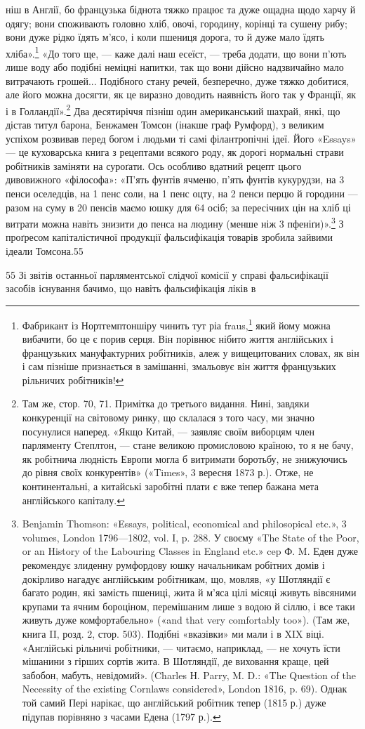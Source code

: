 ніш в Англії, бо французька біднота тяжко працює та дуже
ощадна щодо харчу й одягу; вони споживають головно хліб,
овочі, городину, корінці та сушену рибу; вони дуже рідко їдять
м’ясо, і коли пшениця дорога, то й дуже мало їдять хліба».\footnote{
Фабрикант із Нортгемптоншіру чинить тут ріа fraus,\footnote*{
— благочестивий обман. \emph{Ред.}
} який йому
можна вибачити, бо це є порив серця. Він порівнює нібито життя англійських
і французьких мануфактурних робітників, алеж у вищецитованих
словах, як він і сам пізніше признається в замішанні, змальовує він
життя французьких рільничих робітників!
}
«До того ще, — каже далі наш есеїст, — треба додати, що вони
п’ють лише воду або подібні неміцні напитки, так що вони дійсно
надзвичайно мало витрачають грошей... Подібного стану речей,
безперечно, дуже тяжко добитися, але його можна досягти, як
це виразно доводить наявність його так у Франції, як і в Голландії».\footnote{
Там же, стор. 70, 71. Примітка до третього видання. Нині, завдяки
конкуренції на світовому ринку, що склалася з того часу, ми значно
посунулися наперед. «Якщо Китай, — заявляє своїм виборцям член парляменту
Степлтон, — стане великою промисловою країною, то я не бачу,
як робітнича людність Европи могла б витримати боротьбу, не знижуючись
до рівня своїх конкурентів» («Times», 3 вересня 1873 р.). Отже,
не континентальні, а китайські заробітні плати є вже тепер бажана
мета англійського капіталу.
} Два десятиріччя пізніш один американський шахрай,
янкі, що дістав титул барона, Бенжамен Томсон (інакше граф
Румфорд), з великим успіхом розвивав перед богом і людьми ті
самі філантропічні ідеї. Його «Essays» — це куховарська книга
з рецептами всякого роду, як дорогі нормальні страви робітників
заміняти на суроґати. Ось особливо вдатний рецепт цього
дивовижного «філософа»: «П’ять фунтів ячменю, п’ять фунтів
кукурудзи, на 3 пенси оселедців, на 1 пенс соли, на 1 пенс оцту,
на 2 пенси перцю й городини — разом на суму в 20 пенсів
маємо юшку для 64 осіб; за пересічних цін на хліб ці витрати
можна навіть знизити до  пенса на людину (менше ніж 3 пфеніґи)».\footnote{
Benjamin Thomson: «Essays, political, economical and philosopical
etc.», 3 volumes, London 1796—1802, vol. I, p. 288. У своєму «The
State of the Poor, or an History of the Labouring Classes in England etc.»
cep Ф. M. Еден дуже рекомендує злиденну румфордову юшку начальникам
робітних домів і докірливо нагадує англійським робітникам,
що, мовляв, «у Шотляндії є багато родин, які замість пшениці, жита й
м’яса цілі місяці живуть вівсяними крупами та ячним бороціном, перемішаним
лише з водою й сіллю, і все таки живуть дуже комфортабельно»
(«and that very comfortably too»). (Там же, книга II, розд. 2, стор. 503).
Подібні «вказівки» ми мали і в XIX віці. «Англійські рільничі робітники,
— читаємо, наприклад, — не хочуть їсти мішанини з гірших сортів
жита. В Шотляндії, де виховання краще, цей забобон, мабуть, невідомий».
(Charles Н. Parry, M. D.: «The Question of the Necessity of the
existing Cornlaws considered», London 1816, p. 69). Однак той самий
Пері нарікає, що англійський робітник тепер (1815 р.) дуже підупав
порівняно з часами Едена (1797 р.).
}
З проґресом капіталістичної продукції фальсифікація
товарів зробила зайвими ідеали Томсона.55

55 Зі звітів останньої парляментської слідчої комісії у справі фальсифікації
засобів існування бачимо, що навіть фальсифікація ліків в